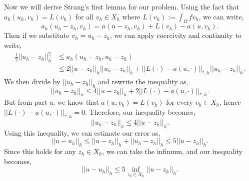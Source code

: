 \documentclass[11pt]{article}
\begin{document}
Now we will derive Strang's first lemma for our problem.
Using the fact that $a_h(u_h,v_h) = L(v_h)$ for all $v_h \in X_h$ where $L(v_h) := \int_\Omega f v_h$, we can write,
\begin{equation*}
    a_h(u_h - z_h, v_h) = a(u - z_h, v_h) + L(v_h) - a(u, v_h).
\end{equation*}
Then if we substitute $v_h = u_h - z_h$, we can apply coercivity and continuity to write,
\begin{align*}
    \frac{1}{2} ||u_h - z_h||^2_h &\leq a_h(u_h - z_h, u_h - z_h) \\
    &\leq 2||u - z_h||_h ||u_h - z_h||_h + ||L(\cdot) - a(u, \cdot)||_{*,h} ||u_h - z_h||_h.
\end{align*}
We then divide by $||u_h - z_h||_h$ and rewrite the inequality as,
\begin{equation*}
    ||u_h - z_h||_h \leq 4 ||u - z_h||_h + 2||L(\cdot) - a(u, \cdot) ||_{*,h}.
\end{equation*}
But from part a. we know that $a(u,v_h) = L(v_h)$ for every $v_h \in X_h$, hence $||L(\cdot) - a(u, \cdot)||_{*,h} = 0$.
Therefore, our inequality becomes,
\begin{equation*}
    ||u_h - z_h||_h \leq 4 ||u - z_h||_h.
\end{equation*}
Using this inequality, we can estimate our error as,
\begin{equation*}
    ||u - u_h||_h \leq ||u - z_h||_h + ||u_h - z_h||_h \leq 5 ||u - z_h||_h.
\end{equation*}
Since this holds for any $z_h \in X_h$, we can take the infimum, and our inequality becomes,
\begin{equation*}
    ||u - u_h||_h \leq 5 \inf_{z_h\in X_h} ||u - z_h||_h.
\end{equation*}
\end{document}
